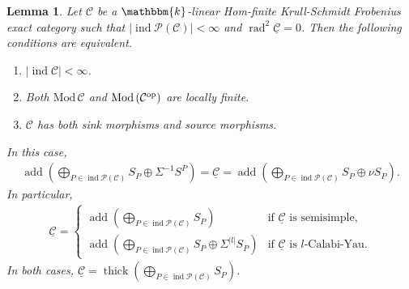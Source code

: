 \documentclass[12pt]{amsart}
\numberwithin{equation}{subsection}
\theoremstyle{plain}
\newtheorem{lemma}[theorem]{Lemma}
\theoremstyle{definition}
\newcommand{\rad}{\operatorname{rad}}
\newcommand{\add}{\operatorname{add}}
\newcommand{\Mod}{\mathrm{Mod}\,}
\newcommand{\Proj}{\mathcal{P}}
\newcommand{\ind}{\operatorname{ind}}
\newcommand{\thick}{\operatorname{thick}}
\newcommand{\C}{\mathcal{C}}
\newcommand{\sC}{\underline{\mathcal{C}}}
\newcommand{\op}{{\rm op}}
\begin{document}
\begin{lemma} \label{claim_17}
Let $\C$ be a $\mathbbm{k}$-linear Hom-finite Krull-Schmidt Frobenius exact category such that $|\ind\Proj(\C)| < \infty$ and $\rad^2\sC=0$.
Then the following conditions are equivalent.
\begin{enumerate}
    \item $|\ind\C| < \infty$.
    \item Both $\Mod\C$ and $\Mod(\C^\op)$ are locally finite.
    \item $\C$ has both sink morphisms and source morphisms.
\end{enumerate}
In this case, 
\begin{align}
    \textstyle \add\left(\bigoplus_{P\in\ind\Proj(\C)} S_P \oplus \Sigma^{-1}S^P\right) 
    = \sC 
    = \add\left(\bigoplus_{P\in\ind\Proj(\C)} S_P \oplus \nu S_P\right).
\end{align}
In particular,
\begin{align}
    \textstyle 
    \sC =     
    \begin{cases}
    \add\left(\bigoplus_{P\in\ind\Proj(\C)} S_P \right) & \text{if $\sC$ is semisimple,}\\[8pt]
    \add\left(\bigoplus_{P\in\ind\Proj(\C)} S_P \oplus \Sigma^{|l|}S_P\right) & \text{if $\sC$ is $l$-Calabi-Yau.}
    \end{cases}
\end{align}
In both cases,  $\sC = \thick\left(\bigoplus_{P\in\ind\Proj(\C)} S_P \right)$.
\end{lemma} 
\end{document}

